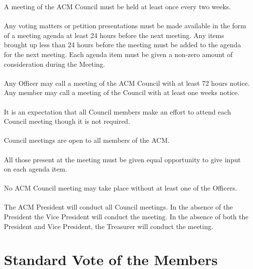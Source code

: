 \documentclass[12pt,titlepage]{article}
\begin{document}
A meeting of the ACM Council must be held at least once every two weeks.\\
\\
Any voting matters or petition presentations must be made available in the form of a meeting agenda at least 24 hours before the next meeting. Any items brought up less than 24 hours before the meeting must be added to the agenda for the next meeting. Each agenda item must be given a non-zero amount of consideration during the Meeting.\\
\\
Any Officer may call a meeting of the ACM Council with at least 72 hours notice.\\

Any member may call a meeting of the Council with at least one weeks notice.\\
\\
It is an expectation that all Council members make an effort to attend each Council meeting though it is not required.\\
\\
Council meetings are open to all members of the ACM.\\
\\
All those present at the meeting must be given equal opportunity to give input on each agenda item.\\
\\
No ACM Council meeting may take place without at least one of the Officers.\\
\\
The ACM President will conduct all Council meetings. In the absence of the President the Vice President will conduct the meeting. In the absence of both the President and Vice President, the Treasurer will conduct the meeting.

\section{Standard Vote of the Members}
\end{document}
